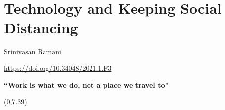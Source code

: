 \chapter{Technology and Keeping Social Distancing}


\begin{center}
{\large\uppercase{$\text{Srinivasan Ramani}$}} 


\end{center}

\vspace{.5cm}

\centerline{\url{https://doi.org/10.34048/2021.1.F3}}



\vspace{5.5cm}


\begin{center}
\textbf{``Work is what we do, not a place we travel to"}
\end{center}
\begin{textblock}{16}(0,7.39)
\noindent{}
\end{textblock}

\newpage



